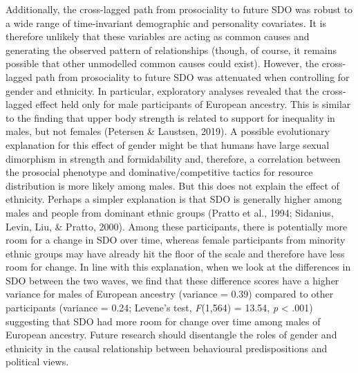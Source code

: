 \documentclass[
  man,floatsintext]{apa6}
\begin{document}
Additionally, the cross-lagged path from prosociality to future SDO was robust
to a wide range of time-invariant demographic and personality covariates. It is
therefore unlikely that these variables are acting as common causes and
generating the observed pattern of relationships (though, of course, it remains
possible that other unmodelled common causes could exist). However, the
cross-lagged path from prosociality to future SDO was attenuated when controlling
for gender and ethnicity. In particular, exploratory analyses revealed that the
cross-lagged effect held only for male participants of European ancestry. This
is similar to the finding that upper body strength is related to support for
inequality in males, but not females (Petersen \& Laustsen, 2019). A possible evolutionary
explanation for this effect of gender might be that humans have large sexual
dimorphism in strength and formidability and, therefore, a correlation between
the prosocial phenotype and dominative/competitive tactics for resource
distribution is more likely among males. But this does not explain the effect of
ethnicity. Perhaps a simpler explanation is that SDO is generally higher among
males and people from dominant ethnic groups (Pratto et al., 1994; Sidanius, Levin, Liu, \& Pratto, 2000). Among
these participants, there is potentially more room for a change in SDO over
time, whereas female participants from minority ethnic groups may have already
hit the floor of the scale and therefore have less room for change. In line with
this explanation, when we look at the differences in SDO between the two waves,
we find that these difference scores have a higher variance for males of
European ancestry (variance = 0.39) compared to other
participants (variance = 0.24; Levene's test,
\emph{F}(1,564) = 13.54,
\emph{p} \textless{} .001) suggesting that SDO had more room for
change over time among males of European ancestry. Future research should
disentangle the roles of gender and ethnicity in the causal relationship
between behavioural predispositions and political views.
\end{document}
